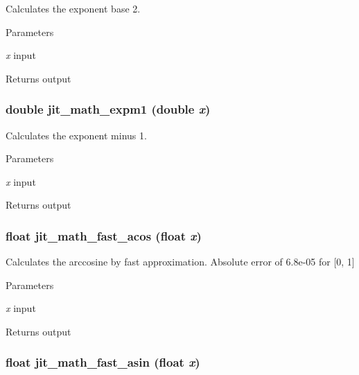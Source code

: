 Calculates the exponent base 2. 
\begin{DoxyParams}{Parameters}
\item[{\em x}]input \end{DoxyParams}
\begin{DoxyReturn}{Returns}
output 
\end{DoxyReturn}
\hypertarget{group__mathmod_ga580bb63b70c7d65e7bfe2c4125dadacb}{
\subsubsection[{jit\_\-math\_\-expm1}]{\setlength{\rightskip}{0pt plus 5cm}double jit\_\-math\_\-expm1 (double {\em x})}}
\label{group__mathmod_ga580bb63b70c7d65e7bfe2c4125dadacb}


Calculates the exponent minus 1. 
\begin{DoxyParams}{Parameters}
\item[{\em x}]input \end{DoxyParams}
\begin{DoxyReturn}{Returns}
output 
\end{DoxyReturn}
\hypertarget{group__mathmod_gace1fc2c392478cb1e2b446b49413bc8c}{
\subsubsection[{jit\_\-math\_\-fast\_\-acos}]{\setlength{\rightskip}{0pt plus 5cm}float jit\_\-math\_\-fast\_\-acos (float {\em x})}}
\label{group__mathmod_gace1fc2c392478cb1e2b446b49413bc8c}


Calculates the arccosine by fast approximation. Absolute error of 6.8e-\/05 for \mbox{[}0, 1\mbox{]}


\begin{DoxyParams}{Parameters}
\item[{\em x}]input \end{DoxyParams}
\begin{DoxyReturn}{Returns}
output 
\end{DoxyReturn}
\hypertarget{group__mathmod_ga23a4fa4d02d54526c8fb052100ce107e}{
\subsubsection[{jit\_\-math\_\-fast\_\-asin}]{\setlength{\rightskip}{0pt plus 5cm}float jit\_\-math\_\-fast\_\-asin (float {\em x})}}
\label{group__mathmod_ga23a4fa4d02d54526c8fb052100ce107e}


